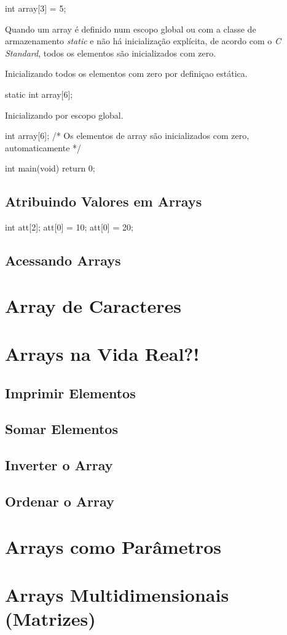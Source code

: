 \begin{ccode}
  int array[3] = {5};
\end{ccode}

Quando um array é definido num escopo global ou com a classe de armazenamento \textit{static} e não há inicialização explícita, de acordo com o \textit{C Standard}, todos os elementos são inicializados com zero.

Inicializando todos os elementos com zero por definiçao estática.

\begin{ccode}
  static int array[6];
\end{ccode}

Inicializando por escopo global.

\begin{ccode}
int array[6];    /* Os elementos de array são inicializados
                    com zero, automaticamente */

int main(void)
{
  return 0;
}
\end{ccode}

\subsection{Atribuindo Valores em Arrays}

\begin{ccode}
  int att[2];
  att[0] = 10;
  att[0] = 20;
\end{ccode}

\subsection{Acessando Arrays}

\section{Array de Caracteres}

\section{Arrays na Vida Real?!}
\subsection{Imprimir Elementos}
\subsection{Somar Elementos}
\subsection{Inverter o Array}
\subsection{Ordenar o Array}

\section{Arrays como Parâmetros}

\section{Arrays Multidimensionais (Matrizes)}


